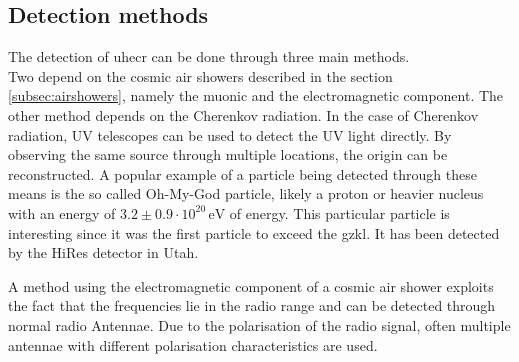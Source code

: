 \documentclass[abstract,toc,los,lof,english,10pt,glossary,acronyms]{jluthesis}
\begin{document}
\subsection{Detection methods}

The detection of \acrshort{uhecr} can be done through three main methods.\\
Two depend on the cosmic air showers described in the section \ref{subsec:airshowers}, namely the muonic and the electromagnetic component. The other method depends on the Cherenkov radiation.
In the case of Cherenkov radiation, UV telescopes can be used to detect the UV light directly. By observing the same source through multiple locations, the origin can be reconstructed. 
A popular example of a particle being detected through these means is the so called Oh-My-God particle, likely a proton or heavier nucleus with an energy of  $3.2\pm0.9\cdot10^{20}\,\text{eV}$ of energy. This particular particle is interesting since it was the first particle to exceed the \acrshort{gzkl}. It has been detected by the HiRes detector in Utah.

A method using the electromagnetic component of a cosmic air shower exploits the fact that the frequencies lie in the radio range\cite{NELLES201513} and can be detected through normal radio Antennae\cite{SCHRODER20171}. Due to the polarisation of the radio signal, often multiple antennae with different polarisation characteristics are used.
\end{document}
